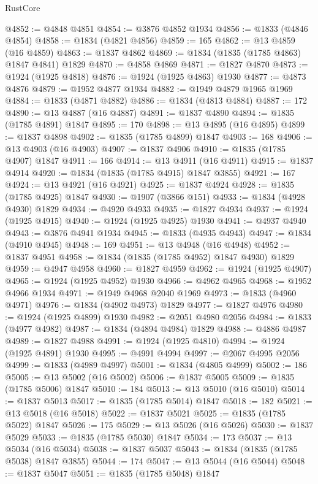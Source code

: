 \begin{lexlean}{RustCore}
\begin{coremodule}
@4852 := @4848 @4851
@4854 := @3876 @4852 @1934
@4856 := @1833 (@4846 @4854)
@4858 := @1834 (@4821 @4856)
@4859 := 165
@4862 := @13 @4859 (@16 @4859)
@4863 := @1837 @4862
@4869 := @1834 (@1835 (@1785 @4863) @1847 @4841) @1829
@4870 := @4858 @4869
@4871 := @1827 @4870
@4873 := @1924 (@1925 @4818)
@4876 := @1924 (@1925 @4863) @1930
@4877 := @4873 @4876
@4879 := @1952 @4877 @1934
@4882 := @1949 @4879 @1965 @1969
@4884 := @1833 (@4871 @4882)
@4886 := @1834 (@4813 @4884)
@4887 := 172
@4890 := @13 @4887 (@16 @4887)
@4891 := @1837 @4890
@4894 := @1835 (@1785 @4891) @1847
@4895 := 170
@4898 := @13 @4895 (@16 @4895)
@4899 := @1837 @4898
@4902 := @1835 (@1785 @4899) @1847
@4903 := 168
@4906 := @13 @4903 (@16 @4903)
@4907 := @1837 @4906
@4910 := @1835 (@1785 @4907) @1847
@4911 := 166
@4914 := @13 @4911 (@16 @4911)
@4915 := @1837 @4914
@4920 := @1834 (@1835 (@1785 @4915) @1847 @3855)
@4921 := 167
@4924 := @13 @4921 (@16 @4921)
@4925 := @1837 @4924
@4928 := @1835 (@1785 @4925) @1847
@4930 := @1907 (@3866 @151)
@4933 := @1834 (@4928 @4930) @1829
@4934 := @4920 @4933
@4935 := @1827 @4934
@4937 := @1924 (@1925 @4915)
@4940 := @1924 (@1925 @4925) @1930
@4941 := @4937 @4940
@4943 := @3876 @4941 @1934
@4945 := @1833 (@4935 @4943)
@4947 := @1834 (@4910 @4945)
@4948 := 169
@4951 := @13 @4948 (@16 @4948)
@4952 := @1837 @4951
@4958 := @1834 (@1835 (@1785 @4952) @1847 @4930) @1829
@4959 := @4947 @4958
@4960 := @1827 @4959
@4962 := @1924 (@1925 @4907)
@4965 := @1924 (@1925 @4952) @1930
@4966 := @4962 @4965
@4968 := @1952 @4966 @1934
@4971 := @1949 @4968 @2040 @1969
@4973 := @1833 (@4960 @4971)
@4976 := @1834 (@4902 @4973) @1829
@4977 := @1827 @4976
@4980 := @1924 (@1925 @4899) @1930
@4982 := @2051 @4980 @2056
@4984 := @1833 (@4977 @4982)
@4987 := @1834 (@4894 @4984) @1829
@4988 := @4886 @4987
@4989 := @1827 @4988
@4991 := @1924 (@1925 @4810)
@4994 := @1924 (@1925 @4891) @1930
@4995 := @4991 @4994
@4997 := @2067 @4995 @2056
@4999 := @1833 (@4989 @4997)
@5001 := @1834 (@4805 @4999)
@5002 := 186
@5005 := @13 @5002 (@16 @5002)
@5006 := @1837 @5005
@5009 := @1835 (@1785 @5006) @1847
@5010 := 184
@5013 := @13 @5010 (@16 @5010)
@5014 := @1837 @5013
@5017 := @1835 (@1785 @5014) @1847
@5018 := 182
@5021 := @13 @5018 (@16 @5018)
@5022 := @1837 @5021
@5025 := @1835 (@1785 @5022) @1847
@5026 := 175
@5029 := @13 @5026 (@16 @5026)
@5030 := @1837 @5029
@5033 := @1835 (@1785 @5030) @1847
@5034 := 173
@5037 := @13 @5034 (@16 @5034)
@5038 := @1837 @5037
@5043 := @1834 (@1835 (@1785 @5038) @1847 @3855)
@5044 := 174
@5047 := @13 @5044 (@16 @5044)
@5048 := @1837 @5047
@5051 := @1835 (@1785 @5048) @1847

\end{coremodule}
\end{lexlean}
